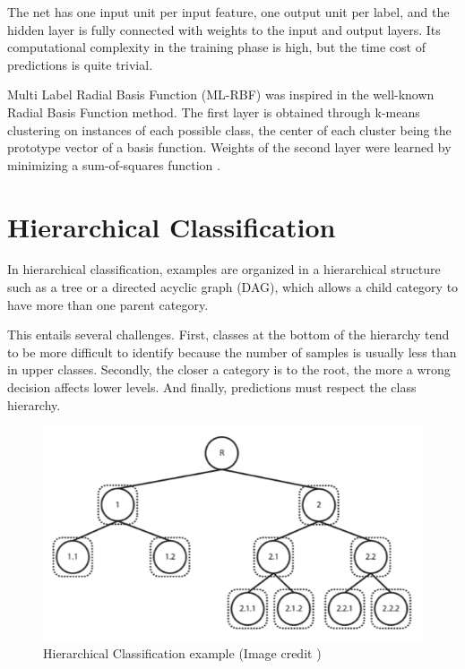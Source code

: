 The net has one input unit per input feature, one output unit
per label, and the hidden layer is fully connected with weights to the input and
output layers. Its computational complexity in the training phase is high, but the
time cost of predictions is quite trivial.


Multi Label Radial Basis Function (ML-RBF) \cite{Zhang2009} was inspired in the well-known Radial Basis Function method. 
The first layer is obtained through k-means clustering on
instances of each possible class, the center of each cluster being the prototype
vector of a basis function. Weights of the second layer were learned by minimizing
a sum-of-squares function \cite{Gibaja2014}.
\newpage

\section{Hierarchical Classification}

In hierarchical classification, examples are organized in a hierarchical
structure such as a tree or a directed acyclic graph (DAG), which allows a child
category to have more than one parent category. 

This entails several challenges.
First, classes at the bottom of the hierarchy tend to be more difficult to identify
because the number of samples is usually less than in upper classes. 
Secondly, the closer a category is to the root, the more a wrong decision affects lower levels. And
finally, predictions must respect the class hierarchy. 

\begin{figure}[th]
    \centering
    \includegraphics[width=1.0\textwidth]{Figures/hierachical.png}
    \decoRule
    \caption[Hierarchical Classification example]{Hierarchical Classification example (Image credit \cite{Silla2011})}
    \label{fig:hierachical}
\end{figure}

